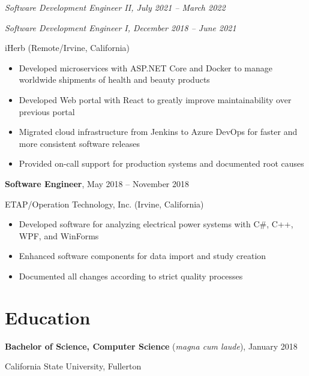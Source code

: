 \documentclass[10pt]{article}
\newcommand{\titleheader}[2]{\textbf{#1}, #2}
\newcommand{\titleextraheader}[3]{\textbf{#1} (#3), #2}
\newcommand{\secondaryheader}[1]{\hspace{2.25em} \textit{#1}}
\newcommand{\locheader}[2]{#1 (#2)}
\newcommand{\instheader}[1]{#1}
\begin{document}
	\secondaryheader{Software Development Engineer II, July 2021 -- March 2022}

	\secondaryheader{Software Development Engineer I, December 2018 -- June 2021}

	\locheader{iHerb}{Remote/Irvine, California}

	\begin{itemize}
		\item Developed microservices with ASP.NET Core and Docker to manage worldwide shipments of health and beauty products
		\item Developed Web portal with React to greatly improve maintainability over previous portal
		\item Migrated cloud infrastructure from Jenkins to Azure DevOps for faster and more consistent software releases
		\item Provided on-call support for production systems and documented root causes
	\end{itemize}

	\titleheader{Software Engineer}{May 2018 -- November 2018}

	\locheader{ETAP/Operation Technology, Inc.}{Irvine, California}

	\begin{itemize}
		\item Developed software for analyzing electrical power systems with C\#, C++, WPF, and WinForms
		\item Enhanced software components for data import and study creation
		\item Documented all changes according to strict quality processes
	\end{itemize}

	\section*{Education}

	\titleextraheader{Bachelor of Science, Computer Science}{January 2018}{\textit{magna cum laude}}

	\instheader{California State University, Fullerton}
\end{document}
